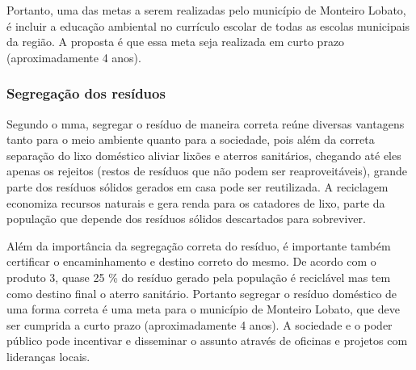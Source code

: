 Portanto, uma das metas a serem realizadas pelo município de Monteiro Lobato, é incluir a educação ambiental no currículo escolar de todas as escolas municipais da região. A proposta é que essa meta seja realizada em curto prazo (aproximadamente 4 anos).

\subsubsection{Segregação dos resíduos}
Segundo o \gls{mma}, segregar o resíduo de maneira correta reúne diversas vantagens tanto para o meio ambiente quanto para a sociedade, pois além da correta separação do lixo doméstico aliviar lixões e aterros sanitários, chegando até eles apenas os rejeitos (restos de resíduos que não podem ser reaproveitáveis), grande parte dos resíduos sólidos gerados em casa pode ser reutilizada. A reciclagem economiza recursos naturais e gera renda para os catadores de lixo, parte da população que depende dos resíduos sólidos descartados para sobreviver.

Além da importância da segregação correta do resíduo, é importante também certificar o encaminhamento e destino correto do mesmo. De acordo com o produto 3, quase 25 \% do resíduo gerado pela população é reciclável mas tem como destino final o aterro sanitário.
Portanto segregar o resíduo doméstico de uma forma correta é uma meta para o município de Monteiro Lobato, que deve ser cumprida a curto prazo (aproximadamente 4 anos). A sociedade e o poder público pode incentivar e disseminar o assunto através de oficinas e projetos com lideranças locais.

